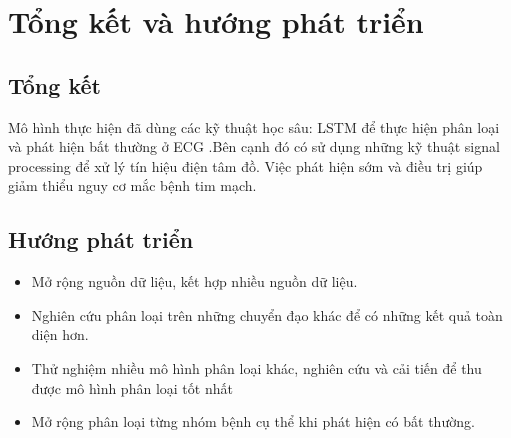 \chapter{Tổng kết và hướng phát triển}
\newpage

\section{Tổng kết}
Mô hình thực hiện đã dùng các kỹ thuật học sâu: LSTM để thực hiện phân loại và phát hiện bất thường ở ECG .Bên cạnh đó có sử dụng những kỹ thuật signal processing để xử lý tín hiệu điện tâm đồ. Việc phát hiện sớm và điều trị giúp giảm thiểu nguy cơ mắc bệnh tim mạch.

\section{Hướng phát triển}
\begin{itemize}
    \item Mở rộng nguồn dữ liệu, kết hợp nhiều nguồn dữ liệu.
    \item Nghiên cứu phân loại trên những chuyển đạo khác để có những kết quả toàn diện hơn.
    \item Thử nghiệm nhiều mô hình phân loại khác, nghiên cứu và cải tiến để thu được mô hình phân loại tốt nhất
    \item Mở rộng phân loại từng nhóm bệnh cụ thể khi phát hiện có bất thường.
\end{itemize}